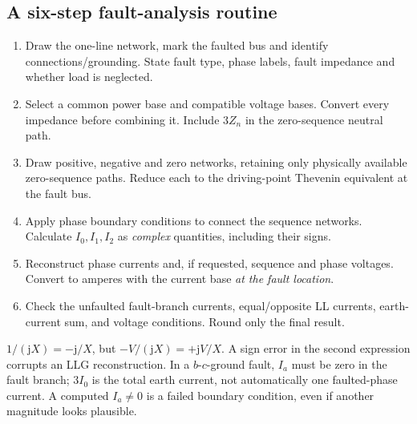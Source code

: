 \documentclass[11pt,a4paper]{article}
\newenvironment{Caution}[1]{\begin{tcolorbox}[colback=warm,colframe=rust,coltitle=white,title={#1}]}{\end{tcolorbox}}
\newcommand{\jj}{\mathrm j}
\begin{document}
\subsection{A six-step fault-analysis routine}
\begin{enumerate}
\item Draw the one-line network, mark the faulted bus and identify connections/grounding. State fault type, phase labels, fault impedance and whether load is neglected.
\item Select a common power base and compatible voltage bases. Convert every impedance before combining it. Include $3Z_n$ in the zero-sequence neutral path.
\item Draw positive, negative and zero networks, retaining only physically available zero-sequence paths. Reduce each to the driving-point Thevenin equivalent at the fault bus.
\item Apply phase boundary conditions to connect the sequence networks. Calculate $I_0,I_1,I_2$ as \emph{complex} quantities, including their signs.
\item Reconstruct phase currents and, if requested, sequence and phase voltages. Convert to amperes with the current base \emph{at the fault location}.
\item Check the unfaulted fault-branch currents, equal/opposite LL currents, earth-current sum, and voltage conditions. Round only the final result.
\end{enumerate}
\begin{Caution}{Checks that catch most mistakes}
$1/(\jj X)=-\jj/X$, but $-V/(\jj X)=+\jj V/X$. A sign error in the second expression corrupts an LLG reconstruction. In a $b$-$c$-ground fault, $I_a$ must be zero in the fault branch; $3I_0$ is the total earth current, not automatically one faulted-phase current. A computed $I_a\ne0$ is a failed boundary condition, even if another magnitude looks plausible.
\end{Caution}
\end{document}
